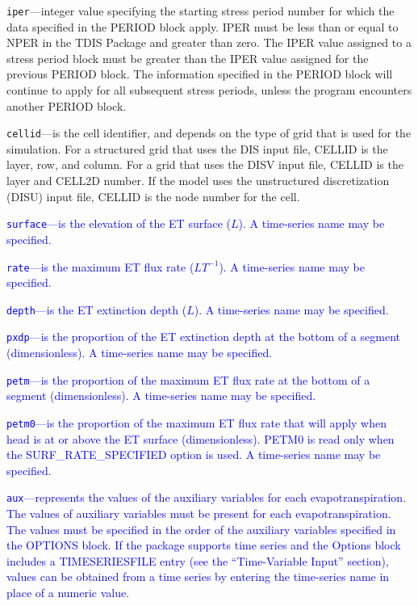 \begin{description}
\item \texttt{iper}---integer value specifying the starting stress period number for which the data specified in the PERIOD block apply.  IPER must be less than or equal to NPER in the TDIS Package and greater than zero.  The IPER value assigned to a stress period block must be greater than the IPER value assigned for the previous PERIOD block.  The information specified in the PERIOD block will continue to apply for all subsequent stress periods, unless the program encounters another PERIOD block.

\item \texttt{cellid}---is the cell identifier, and depends on the type of grid that is used for the simulation.  For a structured grid that uses the DIS input file, CELLID is the layer, row, and column.   For a grid that uses the DISV input file, CELLID is the layer and CELL2D number.  If the model uses the unstructured discretization (DISU) input file, CELLID is the node number for the cell.

\item \textcolor{blue}{\texttt{surface}---is the elevation of the ET surface ($L$). A time-series name may be specified.}

\item \textcolor{blue}{\texttt{rate}---is the maximum ET flux rate ($LT^{-1}$).  A time-series name may be specified.}

\item \textcolor{blue}{\texttt{depth}---is the ET extinction depth ($L$).  A time-series name may be specified.}

\item \textcolor{blue}{\texttt{pxdp}---is the proportion of the ET extinction depth at the bottom of a segment (dimensionless).  A time-series name may be specified.}

\item \textcolor{blue}{\texttt{petm}---is the proportion of the maximum ET flux rate at the bottom of a segment (dimensionless).  A time-series name may be specified.}

\item \textcolor{blue}{\texttt{petm0}---is the proportion of the maximum ET flux rate that will apply when head is at or above the ET surface (dimensionless). PETM0 is read only when the SURF\_RATE\_SPECIFIED option is used. A time-series name may be specified.}

\item \textcolor{blue}{\texttt{aux}---represents the values of the auxiliary variables for each evapotranspiration. The values of auxiliary variables must be present for each evapotranspiration. The values must be specified in the order of the auxiliary variables specified in the OPTIONS block.  If the package supports time series and the Options block includes a TIMESERIESFILE entry (see the ``Time-Variable Input'' section), values can be obtained from a time series by entering the time-series name in place of a numeric value.}


\end{description}
